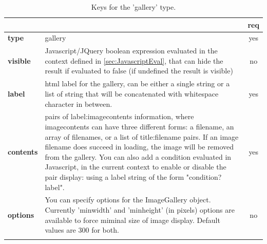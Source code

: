 \begin{longtable}{|>{\bf}L{\linewidth}|L{\linewidth}|c|}
\hline
      &  & {\bf req} 
\tabularnewline \hline \hline
 type       & gallery  & yes \\ \hline
 visible    & Javascript/JQuery boolean expression evaluated in the context 
              defined in \ref{sec:JavascriptEval}, that can hide the result if
              evaluated to false (if undefined the result is visible)& no \\ \hline
 label      & html label for the gallery, can be either a single string or 
             a list of string that will be concatenated with whitespace character
              in between. & yes \\ \hline
 contents   & pairs of label:imagecontents information, where imagecontents can 
              have three different forms: a filename, an array of filenames, or
              a list of title:filename pairs. 
              If an image filename does succeed in loading,
              the image will be removed from the gallery. 
              You can also add a condition evaluated in Javascript,
              in the current context to enable or disable the pair display:
              using a label string of the form "condition?label".
            & yes \\ \hline
 options    & You can specify options for the ImageGallery object. Currently
              'minwidth' and 'minheight' (in pixels) options are available to force
              miminal size of image display. Default values are 300 for both.& no \\ \hline
\caption{Keys for the 'gallery' type.}
\end{longtable}

